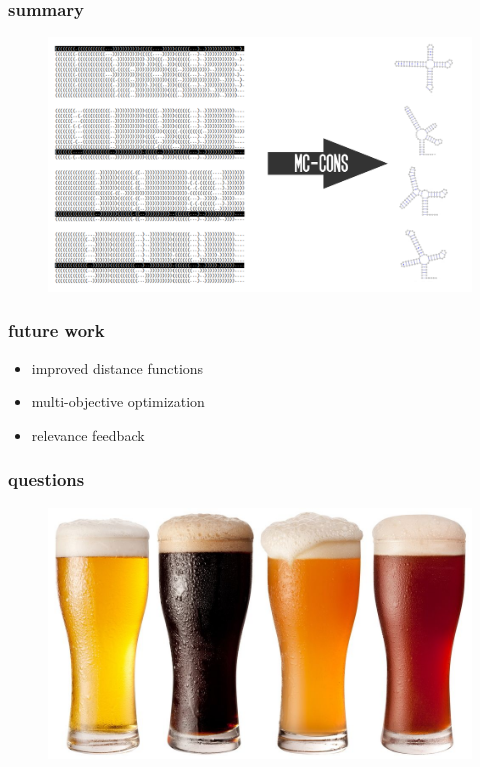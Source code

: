 \documentclass{beamer}
\begin{document}
\begin{frame}
	\frametitle{summary}
		\begin{figure}
	\centering
	\includegraphics[scale=0.8]{figs/problem_setting}
	\end{figure}

\end{frame}

\begin{frame}
	\frametitle{future work}
	\begin{itemize}
		\item improved distance functions
		\item multi-objective optimization
		\item relevance feedback
		\end{itemize}
\end{frame}


\begin{frame}
	\frametitle{questions}
	\begin{figure}
	\centering
	\includegraphics[scale=1]{figs/beer}
	\end{figure}
	
\end{frame}
\end{document}
